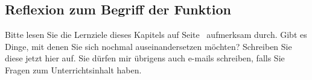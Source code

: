\documentclass[12pt]{article}
\begin{document}
%
%
\newpage
\subsection{Reflexion zum Begriff der Funktion}
Bitte lesen Sie die Lernziele dieses Kapitels auf Seite~\pageref{goals:funktionen_begrifflichkeit} aufmerksam durch. Gibt es Dinge, mit denen Sie sich nochmal auseinandersetzen möchten? Schreiben Sie diese jetzt hier auf. Sie dürfen mir übrigens auch e-mails schreiben, falls Sie Fragen zum Unterrichtsinhalt haben.\\
\end{document}
